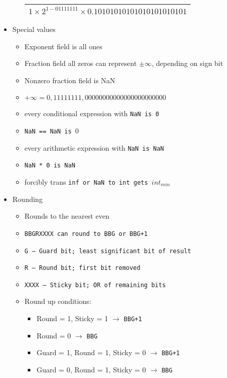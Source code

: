 \begin{itemize}[noitemsep, topsep=1pt]
\begin{itemize}[noitemsep, topsep=1pt]
\begin{tabular}{|c|c|c|}
            \multicolumn{3}{|c|}{$1\times 2^{1-01111111}\times 0.10101010101010101010101$}\\ \hline
            \end{tabular} 
    \end{itemize}
    \item Special values
    \begin{itemize}[noitemsep, topsep=1pt]
        \item Exponent field is all ones
        \item Fraction field all zeros can represent $\pm \infty$, depending on sign bit
        \item Nonzero fraction field is NaN
        \item $+\infty=0,11111111,00000000000000000000000$
        \item every conditional expression with \tt{NaN} is 0
        \item \tt{NaN == NaN} is $0$
        \item every arithmetic expression with \tt{NaN} is \tt{NaN}
        \item \tt{NaN * 0} is \tt{NaN}
        \item forcibly trans \tt{inf} or \tt{NaN} to \tt{int} gets $int_{min}$
    \end{itemize}
    \item Rounding
    \begin{itemize}[noitemsep, topsep=1pt]
        \item Rounds to the nearest even
        \item \tt{BBGRXXXX} can round to \tt{BBG} or \tt{BBG+1}
        \item \tt{G} -- Guard bit; least significant bit of result
        \item \tt{R} -- Round bit; first bit removed
        \item \tt{XXXX} -- Sticky bit; OR of remaining bits
        \item Round up conditions:
        \begin{itemize}[noitemsep, topsep=1pt]
            \item Round = 1, Sticky = 1 $\to$ \tt{BBG+1}
            \item Round = 0 $\to$ \tt{BBG}
            \item Guard = 1, Round = 1, Sticky = 0 $\to$ \tt{BBG+1}
            \item Guard = 0, Round = 1, Sticky = 0 $\to$ \tt{BBG}
        \end{itemize}
    \end{itemize}

\end{itemize}
